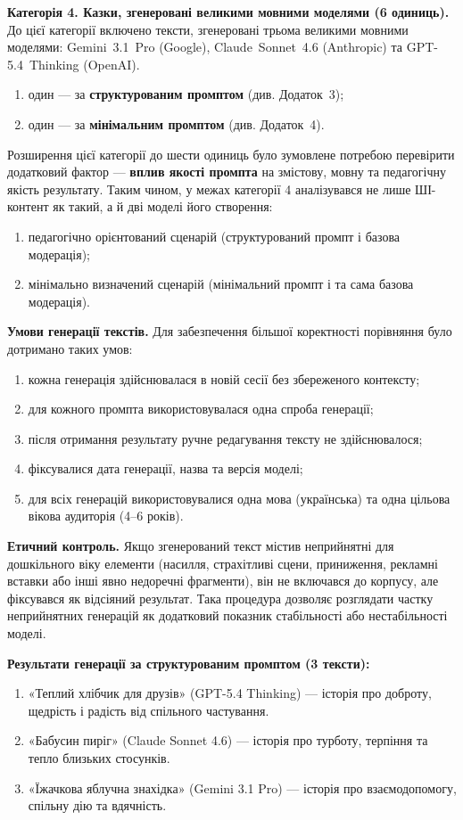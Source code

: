 \documentclass[14pt, a4paper]{extreport}
\begin{document}
\textbf{Категорія 4. Казки, згенеровані великими мовними моделями (6 одиниць).}
До цієї категорії включено тексти, згенеровані трьома великими мовними моделями: Gemini~3.1~Pro (Google), Claude~Sonnet~4.6 (Anthropic) та GPT-5.4~Thinking (OpenAI).
\begin{enumerate}
  \item один --- за \textbf{структурованим промптом} (див. Додаток~3);
  \item один --- за \textbf{мінімальним промптом} (див. Додаток~4).
\end{enumerate}

Розширення цієї категорії до шести одиниць було зумовлене потребою перевірити додатковий фактор --- \textbf{вплив якості промпта} на змістову, мовну та педагогічну якість результату. Таким чином, у межах категорії 4 аналізувався не лише ШІ-контент як такий, а й дві моделі його створення:
\begin{enumerate}
  \item педагогічно орієнтований сценарій (структурований промпт і базова модерація);
  \item мінімально визначений сценарій (мінімальний промпт і та сама базова модерація).
\end{enumerate}
\newpage
\textbf{Умови генерації текстів.}
Для забезпечення більшої коректності порівняння було дотримано таких умов:
\begin{enumerate}
  \item кожна генерація здійснювалася в новій сесії без збереженого контексту;
  \item для кожного промпта використовувалася одна спроба генерації;
  \item після отримання результату ручне редагування тексту не здійснювалося;
  \item фіксувалися дата генерації, назва та версія моделі;
  \item для всіх генерацій використовувалися одна мова (українська) та одна цільова вікова аудиторія (4--6 років).
\end{enumerate}

\textbf{Етичний контроль.}
Якщо згенерований текст містив неприйнятні для дошкільного віку елементи (насилля, страхітливі сцени, приниження, рекламні вставки або інші явно недоречні фрагменти), він не включався до корпусу, але фіксувався як відсіяний результат. Така процедура дозволяє розглядати частку неприйнятних генерацій як додатковий показник стабільності або нестабільності моделі.

\textbf{Результати генерації за структурованим промптом (3 тексти):}
\begin{enumerate}
  \item «Теплий хлібчик для друзів» (GPT-5.4 Thinking) --- історія про доброту, щедрість і радість від спільного частування.
  \item «Бабусин пиріг» (Claude Sonnet 4.6) --- історія про турботу, терпіння та тепло близьких стосунків.
  \item «Їжачкова яблучна знахідка» (Gemini 3.1 Pro) --- історія про взаємодопомогу, спільну дію та вдячність.
\end{enumerate}
\end{document}

